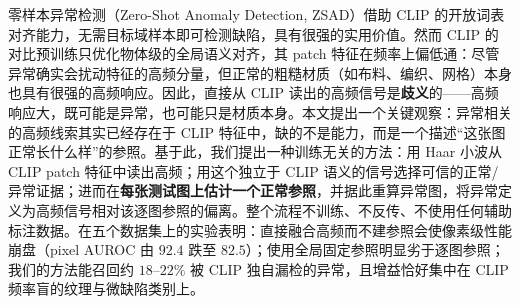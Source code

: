 零样本异常检测（Zero-Shot Anomaly Detection, ZSAD）借助 CLIP 的开放词表对齐能力，无需目标域样本即可检测缺陷，具有很强的实用价值。然而 CLIP 的对比预训练只优化物体级的全局语义对齐，其 patch 特征在频率上偏低通：尽管异常确实会扰动特征的高频分量，但正常的粗糙材质（如布料、编织、网格）本身也具有很强的高频响应。因此，直接从 CLIP 读出的高频信号是\textbf{歧义}的——高频响应大，既可能是异常，也可能只是材质本身。本文提出一个关键观察：异常相关的高频线索其实已经存在于 CLIP 特征中，缺的不是能力，而是一个描述“这张图正常长什么样”的参照。基于此，我们提出一种训练无关的方法：用 Haar 小波从 CLIP patch 特征中读出高频；用这个独立于 CLIP 语义的信号选择可信的正常/异常证据；进而在\textbf{每张测试图上估计一个正常参照}，并据此重算异常图，将异常定义为高频信号相对该逐图参照的偏离。整个流程不训练、不反传、不使用任何辅助标注数据。在五个数据集上的实验表明：直接融合高频而不建参照会使像素级性能崩盘（pixel AUROC 由 $92.4$ 跌至 $82.5$）；使用全局固定参照明显劣于逐图参照；我们的方法能召回约 $18\text{--}22\%$ 被 CLIP 独自漏检的异常，且增益恰好集中在 CLIP 频率盲的纹理与微缺陷类别上。
